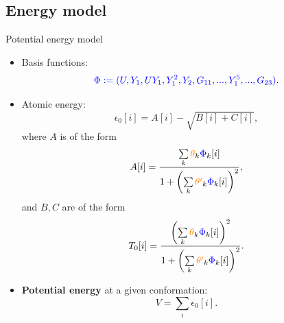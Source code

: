 \documentclass{beamer}
\begin{document}

\subsection{Energy model}
\begin{frame}{Potential energy model}
    \fontsize{8.5}{6}\selectfont
    \begin{itemize}
        \item Basis functions:
        \begin{equation}
            {\color{blue}\Phi := (U, Y_1, UY_1, Y_1^2,Y_2,G_{11},...,Y_1^5,...,G_{23})}.
        \end{equation}
        \item Atomic energy:
        \begin{equation}
            \epsilon_0[i] = A[i] - \sqrt{B[i] + C[i]},
        \end{equation}
        where $A$ is of the form
        \begin{equation}
            A[i] = \frac{\sum\limits_k {\color{orange}\theta}_k {\color{blue}\Phi}_k[i]}{1 + \left(\sum\limits_k {\color{orange}\theta'}_k {\color{blue}\Phi}_k[i] \right)^2},
        \end{equation}
        and $B,C$ are of the form
        \begin{equation}
            T_0[i]  = \frac{\left(\sum\limits_k {\color{orange}\theta}_k {\color{blue}\Phi}_k[i]\right)^2}{1 + \left(\sum\limits_k {\color{orange}\theta'}_k {\color{blue}\Phi}_k[i] \right)^2}.
        \end{equation}
        \item \textbf{Potential energy} at a given conformation:
        \begin{equation}
            V = \sum_i \epsilon_0[i].
        \end{equation}
    \end{itemize}
\end{frame}
\end{document}
